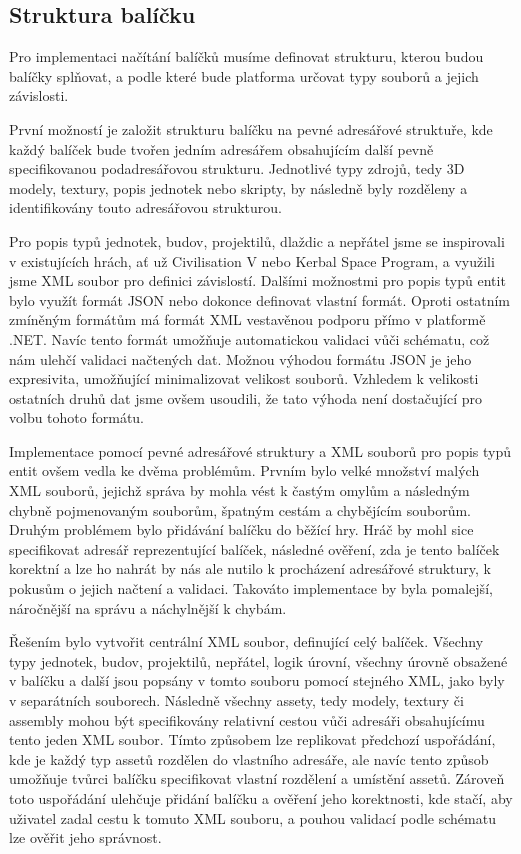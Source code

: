 \subsection{Struktura balíčku}
\label{sec:packagestructure}
Pro implementaci načítání balíčků musíme definovat strukturu, kterou budou balíčky splňovat, a podle které bude platforma určovat typy souborů a jejich závislosti.

První možností je založit strukturu balíčku na pevné adresářové struktuře, kde každý balíček bude tvořen jedním adresářem obsahujícím další pevně specifikovanou podadresářovou strukturu. Jednotlivé typy zdrojů, tedy 3D modely, textury, popis jednotek nebo skripty, by následně byly rozděleny a identifikovány touto adresářovou strukturou. 

Pro popis typů jednotek, budov, projektilů, dlaždic a nepřátel jsme se inspirovali v existujících hrách, ať už Civilisation V\citep{site:civ5} nebo Kerbal Space Program\citep{site:ksp}, a využili jsme XML soubor pro definici závislostí. Dalšími možnostmi pro popis typů entit bylo využít formát JSON nebo dokonce definovat vlastní formát. Oproti ostatním zmíněným formátům má formát XML vestavěnou podporu přímo v platformě .NET. Navíc tento formát umožňuje automatickou validaci vůči schématu, což nám ulehčí  validaci načtených dat. Možnou výhodou formátu JSON je jeho expresivita, umožňující minimalizovat velikost souborů. Vzhledem k velikosti ostatních druhů dat jsme ovšem usoudili, že tato výhoda není dostačující pro volbu tohoto formátu. 

Implementace pomocí pevné adresářové struktury a XML souborů pro popis typů entit ovšem vedla ke dvěma problémům. Prvním bylo velké množství malých XML souborů, jejichž správa by mohla vést k častým omylům a následným chybně pojmenovaným souborům, špatným cestám a chybějícím souborům. Druhým problémem bylo přidávání balíčku do běžící hry. Hráč by mohl sice specifikovat adresář reprezentující balíček, následné ověření, zda je tento balíček korektní a lze ho nahrát by nás ale nutilo k procházení adresářové struktury, k pokusům o jejich načtení a validaci. Takováto implementace by byla pomalejší, náročnější na správu a náchylnější k chybám. 

Řešením bylo vytvořit centrální XML soubor, definující celý balíček. Všechny typy jednotek, budov, projektilů, nepřátel, logik úrovní, všechny úrovně obsažené v balíčku a další jsou popsány v tomto souboru pomocí stejného XML, jako byly v separátních souborech. Následně všechny assety, tedy modely, textury či assembly mohou být specifikovány relativní cestou vůči adresáři obsahujícímu tento jeden XML soubor. Tímto způsobem lze replikovat předchozí uspořádání, kde je každý typ assetů rozdělen do vlastního adresáře, ale navíc tento způsob umožňuje tvůrci balíčku specifikovat vlastní rozdělení a umístění assetů. Zároveň toto uspořádání ulehčuje přidání balíčku a ověření jeho korektnosti, kde stačí, aby uživatel zadal cestu k tomuto XML souboru, a pouhou validací podle schématu lze ověřit jeho správnost.

